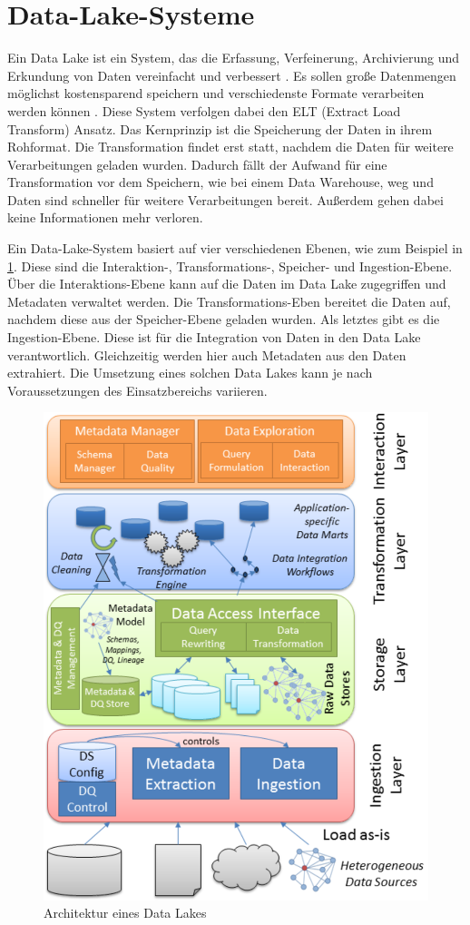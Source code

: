 \section{Data-Lake-Systeme}
\label{sec:einleitung-datalake}

Ein Data Lake ist ein System, das die Erfassung, Verfeinerung, Archivierung und Erkundung von Daten vereinfacht und verbessert \parencite{datalake_01}.
Es sollen große Datenmengen möglichst kostensparend speichern und verschiedenste Formate verarbeiten werden können \parencite{datalake_02}.
Diese System verfolgen dabei den ELT (Extract Load Transform) Ansatz.
Das Kernprinzip ist die Speicherung der Daten in ihrem Rohformat.
Die Transformation findet erst statt, nachdem die Daten für weitere Verarbeitungen geladen wurden.
Dadurch fällt der Aufwand für eine Transformation vor dem Speichern, wie bei einem Data Warehouse, weg und Daten sind schneller für weitere Verarbeitungen bereit.
Außerdem gehen dabei keine Informationen mehr verloren.

Ein Data-Lake-System basiert auf vier verschiedenen Ebenen, wie zum Beispiel in \cref{fig:datalake}.
Diese sind die Interaktion-, Transformations-, Speicher- und Ingestion-Ebene.
Über die Interaktions-Ebene kann auf die Daten im Data Lake zugegriffen und Metadaten verwaltet werden.
Die Transformations-Eben bereitet die Daten auf, nachdem diese aus der Speicher-Ebene geladen wurden.
Als letztes gibt es die Ingestion-Ebene.
Diese ist für die Integration von Daten in den Data Lake verantwortlich.
Gleichzeitig werden hier auch Metadaten aus den Daten extrahiert.
Die Umsetzung eines solchen Data  Lakes kann je nach Voraussetzungen des Einsatzbereichs variieren.

\begin{figure}
    \centering
    \includegraphics[width=.645\textwidth]{Grafiken/data_lake_architecture.PNG}
    \caption{Architektur eines Data Lakes \parencite{datalake_03}}
    \label{fig:datalake}
\end{figure}
\vfill

